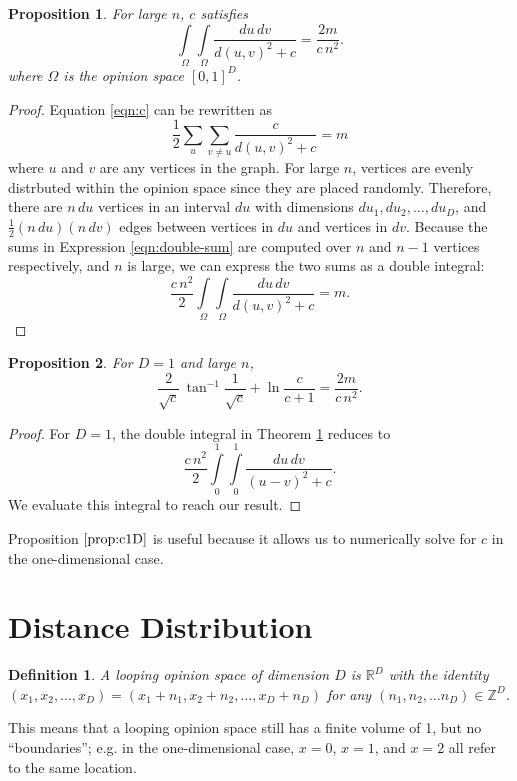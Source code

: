 \documentclass[a4paper,10pt]{article}
\newtheorem{defn}{Definition}
\newtheorem{prop}{Proposition}
\begin{document}
\begin{prop}
\label{prop:c}
For large $n$, $c$ satisfies
 \begin{equation*}
  \int\limits_\Omega \int\limits_\Omega \frac{du \, dv}{d(u, v)^2 + c} = \frac{2m}{c\,n^2}.
 \end{equation*}
where $\Omega$ is the opinion space $[0, 1]^D$.
\end{prop}
\begin{proof}
 Equation \ref{eqn:c} can be rewritten as
 \begin{equation}
 \label{eqn:double-sum}
  \frac{1}{2} \sum\limits_{u}\sum\limits_{v \neq u} \frac{c}{d(u, v)^2 + c} = m
 \end{equation}
 where $u$ and $v$ are any vertices in the graph. For large $n$, vertices are evenly distrbuted within the opinion space since they are placed randomly. Therefore, there are $n \,du$ vertices in an interval $du$ with dimensions $du_1, du_2, \ldots, du_D$, and $\frac{1}{2}(n\, du)(n\, dv)$ edges between vertices in $du$ and vertices in $dv$. Because the sums in Expression \ref{eqn:double-sum} are computed over $n$ and $n - 1$ vertices respectively, and $n$ is large, we can express the two sums as a double integral:
 \begin{equation}
  \frac{c\,n^2}{2} \int\limits_\Omega \int\limits_\Omega \frac{du \, dv}{d(u, v)^2 + c} = m.
 \end{equation}
\end{proof}
\begin{prop}
\label{prop:c1D}
 For $D=1$ and large $n$,
 \begin{equation*}
  \frac{2}{\sqrt{c}}\,\tan^{-1} \frac{1}{\sqrt{c}} + \ln\frac{c}{c+1} = \frac{2m}{c\,n^2}.
 \end{equation*}
\end{prop}
\begin{proof}
For $D=1$, the double integral in Theorem \ref{prop:c} reduces to
 \begin{equation}
  \frac{c\,n^2}{2} \int\limits_0^1 \int\limits_0^1 \frac{du \, dv}{(u - v)^2 + c}.
 \end{equation}
We evaluate this integral to reach our result.
\end{proof}
Proposition $\ref{prop:c1D}$ is useful because it allows us to numerically solve for $c$ in the one-dimensional case.

\section{Distance Distribution}
\begin{defn}
 A looping opinion space of dimension $D$ is $\mathbb{R}^D$ with the identity $(x_1, x_2, \ldots, x_D) = (x_1 + n_1, x_2 + n_2, \ldots, x_D + n_D)$ for any $(n_1, n_2, \ldots n_D) \in \mathbb{Z}^D$. 
\end{defn}
This means that a looping opinion space still has a finite volume of 1, but no ``boundaries''; e.g. in the one-dimensional case, $x = 0$, $x = 1$, and $x = 2$ all refer to the same location.
\end{document}
